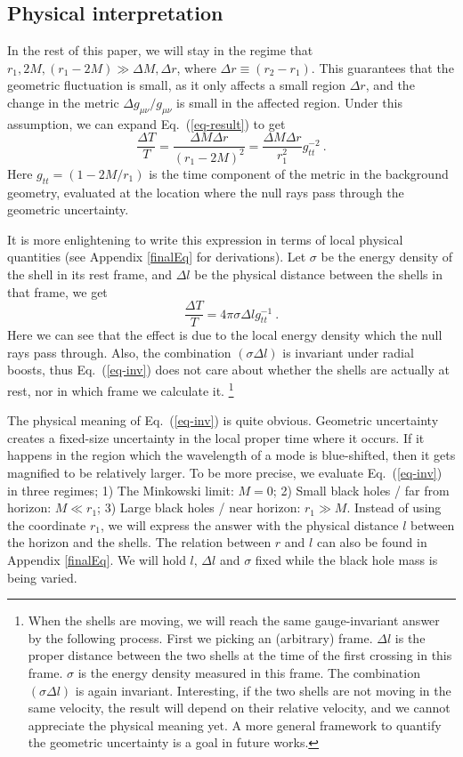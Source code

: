 \documentclass[aps,showpacs,onecolumn,floats,prd,superscriptaddress,nofootinbib]{revtex4-1}
\begin{document}
\subsection{Physical interpretation}

In the rest of this paper, we will stay in the regime that $r_1, 2M, (r_1-2M) \gg \Delta M, \Delta r$, where $\Delta r \equiv(r_2-r_1)$. 
This guarantees that the geometric fluctuation is small, as it only affects a small region $\Delta r$, and the change in the metric $\Delta g_{\mu\nu}/g_{\mu\nu}$ is small in the affected region.
Under this assumption, we can expand Eq.~(\ref{eq-result}) to get 
\begin{equation}
	\frac{\Delta T}{T} = \frac{\Delta M \Delta r}{(r_1-2M)^2} = \frac{\Delta M \Delta r}{r_1^2} g_{tt}^{-2}~.
		\label{lim-result}
\end{equation}
Here $g_{tt}=(1-2M/r_1)$ is the time component of the metric in the background geometry, evaluated at the location where the null rays pass through the geometric uncertainty. 

It is more enlightening to write this expression in terms of local physical quantities (see Appendix \ref{finalEq} for derivations).  Let $\sigma$ be the energy density of the shell in its rest frame, and $\Delta l$ be the physical distance between the shells in that frame, we get
\begin{equation}
	\frac{\Delta T}{T} = 4 \pi \sigma \Delta l g_{tt}^{-1}~.
	\label{eq-inv}
\end{equation}
Here we can see that the effect is due to the local energy density which the null rays pass through.
Also, the combination $(\sigma\Delta l)$ is invariant under radial boosts, thus Eq.~(\ref{eq-inv}) does not care about whether the shells are actually at rest, nor in which frame we calculate it. \footnote{When the shells are moving, we will reach the same gauge-invariant answer by the following process.
First we picking an (arbitrary) frame.
$\Delta l$ is the proper distance between the two shells at the time of the first crossing in this frame.
$\sigma$ is the energy density measured in this frame.
The combination $(\sigma\Delta l)$ is again invariant.
Interesting, if the two shells are not moving in the same velocity, the result will depend on their relative velocity, and we cannot appreciate the physical meaning yet.
A more general framework to quantify the geometric uncertainty is a goal in future works.
}

The physical meaning of Eq.~(\ref{eq-inv}) is quite obvious. 
Geometric uncertainty creates a fixed-size uncertainty in the local proper time where it occurs.
If it happens in the region which the wavelength of a mode is blue-shifted, then it gets magnified to be relatively larger.
To be more precise, we evaluate Eq.~(\ref{eq-inv}) in three regimes; 
1) The Minkowski limit: $M=0$; 
2) Small black holes / far from horizon: $M \ll r_1$; 
3) Large black holes / near horizon: $r_1\gg M$. 
Instead of using the coordinate $r_1$, we will express the answer with the physical distance $l$ between the horizon and the shells. 
The relation between $r$ and $l$ can also be found in Appendix \ref{finalEq}. 
We will hold $l$, $\Delta l$ and $\sigma$ fixed while the black hole mass is being varied.
\end{document}
